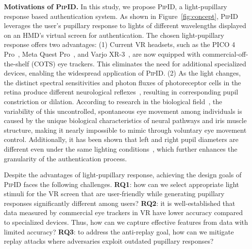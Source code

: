 \documentclass[sigconf]{acmart}
\newcommand{\sysname}{\textsc{PipID}\xspace}
\begin{document}
\noindent \textbf{Motivations of \sysname.}
In this study, we propose \sysname, a light-pupillary  response based authentication system. As shown in Figure~\ref{fig:concept}, \sysname leverages the user's pupillary response to lights of different wavelengths displayed on an HMD's virtual screen for authentication. The chosen light-pupillary response offers two advantages: (1) Current VR headsets, such as the PICO 4 Pro~\cite{PICO4PRO}, Meta Quest Pro~\cite{MetaQuestPro}, and Varjo XR-3~\cite{Varjo}, are now equipped with commercial-off-the-shelf (COTS) eye trackers. This eliminates the need for additional specialized devices, enabling the widespread application of \sysname. (2) As the light changes, the distinct spectral sensitivities and photon fluxes of photoreceptor cells in the retina produce different neurological reflexes~\cite{Bonmati_fneur201801019, MCDOUGAL201072, lobato2014pupillary}, resulting in corresponding pupil constriction or dilation. According to research in the biological field~\cite{Yasukouchi2007, Winn1994, Bergamin1998}, the variability of this uncontrolled, spontaneous eye movement among individuals is caused by the unique biological characteristics of neural pathways and iris muscle structure, making it nearly impossible to mimic through voluntary eye movement control. Additionally, it has been shown that left and right pupil diameters are different even under the same lighting conditions~\cite{POP2002283}, which further enhances the granularity of the authentication process.

Despite the advantages of light-pupillary response, achieving the design goals of \sysname faces the following challenges. \textbf{RQ1}: how can we select appropriate light stimuli for the VR screen that are user-friendly while generating pupillary responses significantly different among users? \textbf{RQ2}: it is well-established that data measured by commercial eye trackers in VR have lower accuracy compared to specialized devices\cite{HTCWhitePaper,MetaPreliminary,HTCValidation,AppleValidation}. Thus, how can we capture effective features from data with limited accuracy? \textbf{RQ3}: to address the anti-replay goal, how can we mitigate replay attacks where adversaries exploit outdated pupillary responses?
\end{document}
